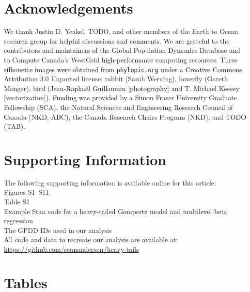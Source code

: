 \section{Acknowledgements}

We thank Justin D. Yeakel, TODO, and other members of the Earth to Ocean
research group for helpful discussions and comments. We are grateful to the
contributors and maintainers of the Global Population Dynamics Database and to
Compute Canada's WestGrid high-performance computing resources. Three
silhouette images were obtained from \texttt{phylopic.org} under a Creative
Commons Attribution 3.0 Unported license: rabbit (Sarah Werning), hoverfly
(Gareth Monger), bird (Jean-Raphaël Guillaumin {[}photography{]} and T. Michael
Keesey {[}vectorization{]}). Funding was provided by a Simon Fraser University
Graduate Fellowship (SCA), the Natural Sciences and Engineering Research
Council of Canada (NKD, ABC), the Canada Research Chairs Program (NKD), and
TODO (TAB).

\section{Supporting Information}

The following supporting information is available online for this article:\\
Figures S1--S11\\
Table S1\\
Example Stan code for a heavy-tailed Gompertz model and multilevel beta
regression\\
The GPDD IDs used in our analysis\\
All code and data to recreate our analysis are available at:\\
\url{https://github.com/seananderson/heavy-tails}




\clearpage

\section{Tables}



